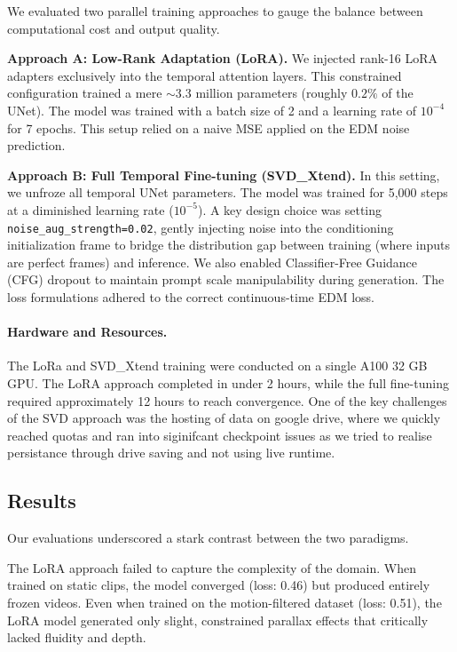 \documentclass[10pt,twocolumn,letterpaper]{article}
\begin{document}
We evaluated two parallel training approaches to gauge the balance between computational cost and output quality.

\textbf{Approach A: Low-Rank Adaptation (LoRA).} We injected rank-16 LoRA adapters exclusively into the temporal attention layers. This constrained configuration trained a mere $\sim$3.3 million parameters (roughly $0.2\%$ of the UNet). The model was trained with a batch size of 2 and a learning rate of $10^{-4}$ for 7 epochs. This setup relied on a naive MSE applied on the EDM noise prediction.

\textbf{Approach B: Full Temporal Fine-tuning (SVD\_Xtend).} In this setting, we unfroze all temporal UNet parameters. The model was trained for 5,000 steps at a diminished learning rate ($10^{-5}$). A key design choice was setting \texttt{noise\_aug\_strength=0.02}, gently injecting noise into the conditioning initialization frame to bridge the distribution gap between training (where inputs are perfect frames) and inference. We also enabled Classifier-Free Guidance (CFG) dropout to maintain prompt scale manipulability during generation. The loss formulations adhered to the correct continuous-time EDM loss.

\paragraph{Hardware and Resources.} The LoRa and SVD\_Xtend training were conducted on a single A100 32 GB GPU. The LoRA approach completed in under 2 hours, while the full fine-tuning required approximately 12 hours to reach convergence.
One of the key challenges of the SVD approach was the hosting of data on google drive, where we quickly reached quotas and ran into siginifcant checkpoint issues as we tried to realise persistance through drive saving and not using live runtime. 

\subsection{Results}

Our evaluations underscored a stark contrast between the two paradigms.

The LoRA approach failed to capture the complexity of the domain. When trained on static clips, the model converged (loss: 0.46) but produced entirely frozen videos. Even when trained on the motion-filtered dataset (loss: 0.51), the LoRA model generated only slight, constrained parallax effects that critically lacked fluidity and depth.
\end{document}

